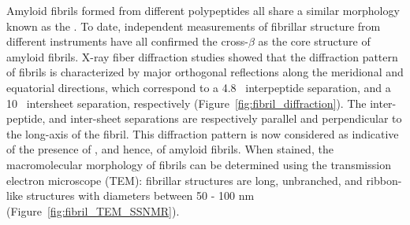 Amyloid fibrils formed from different polypeptides all share a similar morphology known as the \crossbs.\cite{Chiti:2006fz} To date, independent measurements of fibrillar structure from different instruments have all confirmed the cross-$\beta$ as the core structure of amyloid fibrils.  X-ray fiber diffraction studies showed that the diffraction pattern of fibrils is characterized by major orthogonal reflections along the meridional and equatorial directions, which correspond to a 4.8 \angstrom\ interpeptide separation, and a 10 \angstrom\ intersheet separation, respectively (Figure~\ref{fig:fibril_diffraction}).\cite{Sunde:1997cq,Makin:2005un,Sipe:2000fs} The inter-peptide, and inter-sheet separations are respectively parallel and perpendicular to the long-axis of the fibril. This diffraction pattern is now considered as indicative of the presence of \crossbs, and hence, of amyloid fibrils.\cite{Chiti:2006fz} When stained, the macromolecular morphology of fibrils can be determined using the transmission electron microscope (TEM): fibrillar structures are long, unbranched, and ribbon-like structures with diameters between 50 - 100 nm (Figure~\ref{fig:fibril_TEM_SSNMR}).\cite{Chiti:2006fz} 


